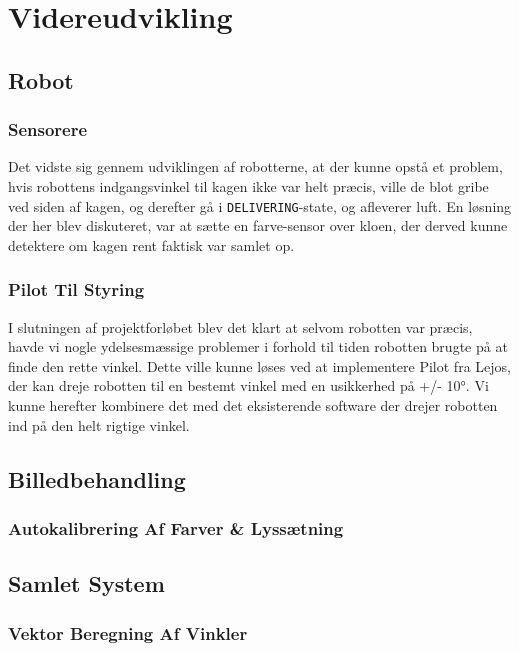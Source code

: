 \chapter{Videreudvikling}
\section{Robot}
\subsection{Sensorere}
Det vidste sig gennem udviklingen af robotterne, at der kunne opstå et problem, hvis robottens indgangsvinkel til kagen ikke var helt præcis, ville de blot gribe ved siden af kagen, og derefter gå i \texttt{DELIVERING}-state, og afleverer luft. En løsning der her blev diskuteret, var at sætte en farve-sensor over kloen, der derved kunne detektere om kagen rent faktisk var samlet op.

\subsection{Pilot Til Styring}
I slutningen af projektforløbet blev det klart at selvom robotten var præcis, havde vi nogle ydelsesmæssige problemer i forhold til tiden robotten brugte på at finde den rette vinkel. Dette ville kunne løses ved at implementere Pilot fra Lejos, der kan dreje robotten til en bestemt vinkel med en usikkerhed på +/- 10°. Vi kunne herefter kombinere det med det eksisterende software der drejer robotten ind på den helt rigtige vinkel.

\section{Billedbehandling}
\subsection{Autokalibrering Af Farver \& Lyssætning}
\section{Samlet System}
\subsection{Vektor Beregning Af Vinkler}
